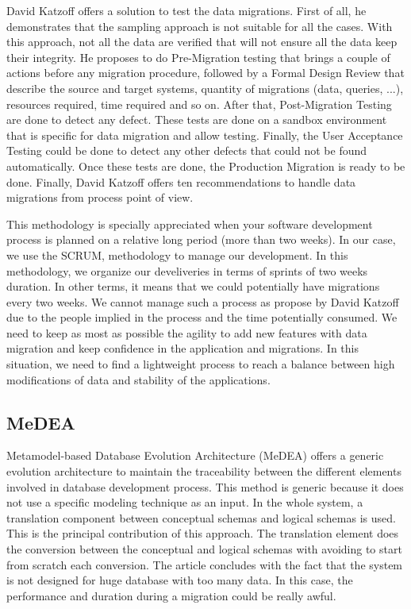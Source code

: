 David Katzoff \cite{katzoff_how_2011} offers a solution to test the data migrations. First of all, he demonstrates that the sampling approach is not suitable for all the cases. With this approach, not all the data are verified that will not ensure all the data keep their integrity. He proposes to do Pre-Migration testing that brings a couple of actions before any migration procedure, followed by a Formal Design Review that describe the source and target systems, quantity of migrations (data, queries, ...), resources required, time required and so on. After that, Post-Migration Testing are done to detect any defect. These tests are done on a sandbox environment that is specific for data migration and allow testing. Finally, the User Acceptance Testing could be done to detect any other defects that could not be found automatically. Once these tests are done, the Production Migration is ready to be done. Finally, David Katzoff offers ten recommendations to handle data migrations from process point of view.

This methodology is specially appreciated when your software development process is planned on a relative long period (more than two weeks). In our case, we use the SCRUM\cite{schwaber_agile_2002}, \cite{scrum} methodology to manage our development. In this methodology, we organize our develiveries in terms of sprints of two weeks duration. In other terms, it means that we could potentially have migrations every two weeks. We cannot manage such a process as propose by David Katzoff due to the people implied in the process and the time potentially consumed. We need to keep as most as possible the agility to add new features with data migration and keep confidence in the application and migrations. In this situation, we need to find a lightweight process to reach a balance between high modifications of data and stability of the applications. 

\subsection{MeDEA}

Metamodel-based Database Evolution Architecture (MeDEA)\cite{Dominguez2008419} offers a generic evolution architecture to maintain the traceability between the different elements involved in database development process. This method is generic because it does not use a specific modeling technique as an input. In the whole system, a translation component between conceptual schemas and logical schemas is used. This is the principal contribution of this approach. The translation element does the conversion between the conceptual and logical schemas with avoiding to start from scratch each conversion. The article concludes with the fact that the system is not designed for huge database with too many data. In this case, the performance and duration during a migration could be really awful.

